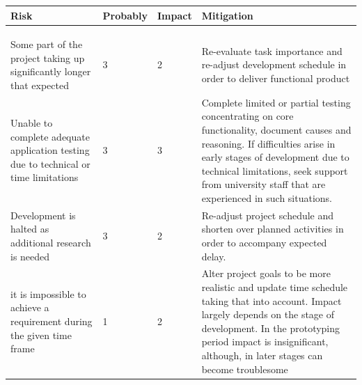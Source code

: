 \documentclass{article}
\begin{document}
\def\riskaaaa{Some part of the project taking up significantly longer that expected}
\def \probabilityaaaa {3}
\def \impactaaaa {2}
\def \mitigationaaaa {Re-evaluate task importance and re-adjust development schedule in order to deliver functional product }

\def\riskaaaaa{Unable to complete adequate application testing due to technical or time limitations}
\def \probabilityaaaaa {3}
\def \impactaaaaa {3}
\def \mitigationaaaaa {Complete limited or partial testing concentrating on core functionality, document causes and reasoning. If difficulties arise in early stages of development  due to technical limitations, seek support from university staff that are experienced in such situations. }

\def\riskaaaaaa{Development is halted as additional research is needed}
\def \probabilityaaaaaa {3}
\def \impactaaaaaaa {2}
\def \mitigationaaaaaa {Re-adjust project schedule and shorten over planned activities in order to accompany expected delay.}


\def\riskaaaaaaa{it is impossible to achieve a requirement during the given time frame}
\def \probabilityaaaaaaa {1}
\def \impactaaaaaa {2}
\def \mitigationaaaaaaa {Alter project goals to be more realistic and update time schedule taking that into account. Impact largely depends on the stage of development. In the prototyping period impact is insignificant, although, in later stages can become troublesome}


\begin{center}
	\begin{tabular}{ |m{5cm}|m{2cm}|m{1cm}|m{6cm}| } 
		\hline
		Risk & Probably & Impact & Mitigation \\ 
		\hline
		\riska & \probabilitya & \impacta & \mitigationa \\ 
		\hline
		\riskaa & \probabilityaa & \impactaa & \mitigationaa \\ 
		\hline
		\riskaaa & \probabilityaaa & \impactaaa & \mitigationaaa \\ 
		\hline
		\riskaaaa & \probabilityaaaa & \impactaaaa & \mitigationaaaa \\ 
		\hline
		\riskaaaaa & \probabilityaaaaa & \impactaaaaa & \mitigationaaaaa \\ 
		\hline
		\riskaaaaaa & \probabilityaaaaaa & \impactaaaaaa & \mitigationaaaaaa \\ 
		\hline
		\riskaaaaaaa & \probabilityaaaaaaa & \impactaaaaaaa & \mitigationaaaaaaa \\ 
		\hline
	\end{tabular}
\end{center}
\end{document}

